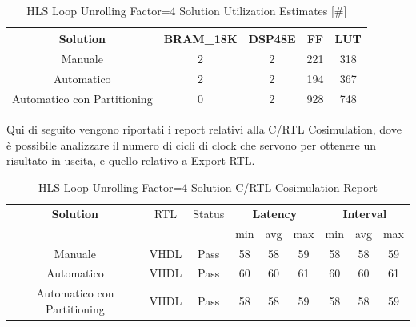 \begin{table}[H]
    \centering
    \begin{tabular}{|c|c|c|c|c|}
        \hline
        \textbf{Solution} & \textbf{BRAM\_18K} & \textbf{DSP48E} & \textbf{FF} & \textbf{LUT} \\
        \hline
        Manuale & 2 & 2 & 221 & 318 \\
        \hline
        Automatico & 2 & 2 & 194 & 367 \\
        \hline
        Automatico con Partitioning & 0 & 2 & 928 & 748 \\
        \hline
    \end{tabular}
    \caption{HLS Loop Unrolling Factor=4 Solution Utilization Estimates [\#]}
    \label{tab:vivado-loop-unrolling-factor4-solution-utilization-report}
\end{table}

Qui di seguito vengono riportati i report relativi alla C/RTL Cosimulation, dove è possibile analizzare il numero di cicli di clock che servono per ottenere un risultato in uscita, e quello relativo a Export RTL.

\begin{table}[H]
    \centering
    \begin{tabular}{|c|c|c|c|c|c|c|c|c|}
        \hline
        \multicolumn{1}{|c|}{\textbf{Solution}} & \multicolumn{1}{|c|}{RTL} & \multicolumn{1}{|c|}{Status} & \multicolumn{3}{c|}{\textbf{Latency}} & \multicolumn{3}{c|}{\textbf{Interval}} \\
        & &  & min & avg & max & min & avg & max \\
        \hline
        Manuale & VHDL & Pass & 58 & 58 & 59 & 58 & 58 & 59 \\
        \hline
        Automatico & VHDL & Pass & 60 & 60 & 61 & 60 & 60 & 61 \\
        \hline
        Automatico con Partitioning & VHDL & Pass & 58 & 58 & 59 & 58 & 58 & 59 \\
        \hline
    \end{tabular}
    \caption{HLS Loop Unrolling Factor=4 Solution C/RTL Cosimulation Report }
    \label{tab:hls-loop-unrolling-factor4-solution-cosimulation-report}
\end{table}

